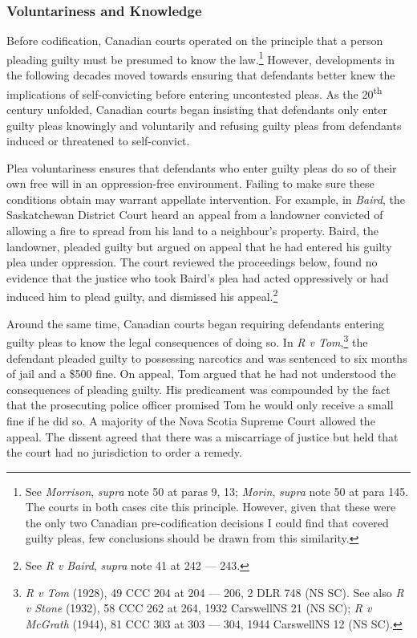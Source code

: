 \subsubsection{Voluntariness and Knowledge}

Before codification, Canadian courts operated on the principle that a person pleading guilty must be presumed to know the law.\footnote{See \textit{Morrison}, \textit{supra} note 50 at paras 9, 13; \textit{Morin}, \textit{supra} note 50 at para 145. The courts in both cases cite this principle. However, given that these were the only two Canadian pre-codification decisions I could find that covered guilty pleas, few conclusions should be drawn from this similarity.} However, developments in the following decades moved towards ensuring that defendants better knew the implications of self-convicting before entering uncontested pleas. As the 20\textsuperscript{th} century unfolded, Canadian courts began insisting that defendants only enter guilty pleas knowingly and voluntarily and refusing guilty pleas from defendants induced or threatened to self-convict.

Plea voluntariness ensures that defendants who enter guilty pleas do so of their own free will in an oppression-free environment. Failing to make sure these conditions obtain may warrant appellate intervention. For example, in \textit{Baird}, the Saskatchewan District Court heard an appeal from a landowner convicted of allowing a fire to spread from his land to a neighbour's property. Baird, the landowner, pleaded guilty but argued on appeal that he had entered his guilty plea under oppression. The court reviewed the proceedings below, found no evidence that the justice who took Baird's plea had acted oppressively or had induced him to plead guilty, and dismissed his appeal.\footnote{See \textit{R v Baird}, \textit{supra} note 41 at 242 — 243.}

Around the same time, Canadian courts began requiring defendants entering guilty pleas to know the legal consequences of doing so. In \textit{R v Tom},\footnote{\textit{R v Tom} (1928), 49 CCC 204 at 204 — 206, 2 DLR 748 (NS SC). See also \textit{R v Stone} (1932), 58 CCC 262 at 264, 1932 CarswellNS 21 (NS SC); \textit{R v McGrath} (1944), 81 CCC 303 at 303 — 304, 1944 CarswellNS 12 (NS SC).} the defendant pleaded guilty to possessing narcotics and was sentenced to six months of jail and a \$500 fine. On appeal, Tom argued that he had not understood the consequences of pleading guilty. His predicament was compounded by the fact that the prosecuting police officer promised Tom he would only receive a small fine if he did so. A majority of the Nova Scotia Supreme Court allowed the appeal. The dissent agreed that there was a miscarriage of justice but held that the court had no jurisdiction to order a remedy. 

